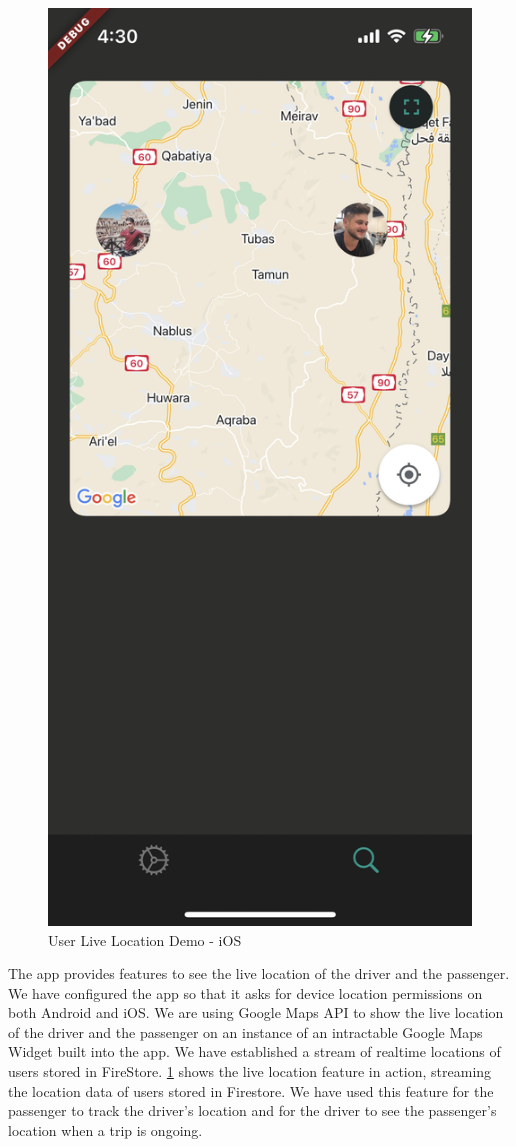 \documentclass[a4paper, 12pt]{report} %
\begin{document}
            \begin{figure}
                \centering
                \includegraphics[width=0.65\linewidth]{Images/live_location.png}
                \caption{User Live Location Demo - iOS}
                \label{fig:live_location_demo}
            \end{figure}
            
            The app provides features to see the live location of the driver and the passenger. We have configured the app so that it asks for device location permissions on both Android and iOS. We are using Google Maps API to show the live location of the driver and the passenger on an instance of an intractable Google Maps Widget built into the app. We have established a stream of realtime locations of users stored in FireStore. \ref{fig:live_location_demo} shows the live location feature in action, streaming the location data of users stored in Firestore. We have used this feature for the passenger to track the driver's location and for the driver to see the passenger's location when a trip is ongoing.
       
\end{document}
